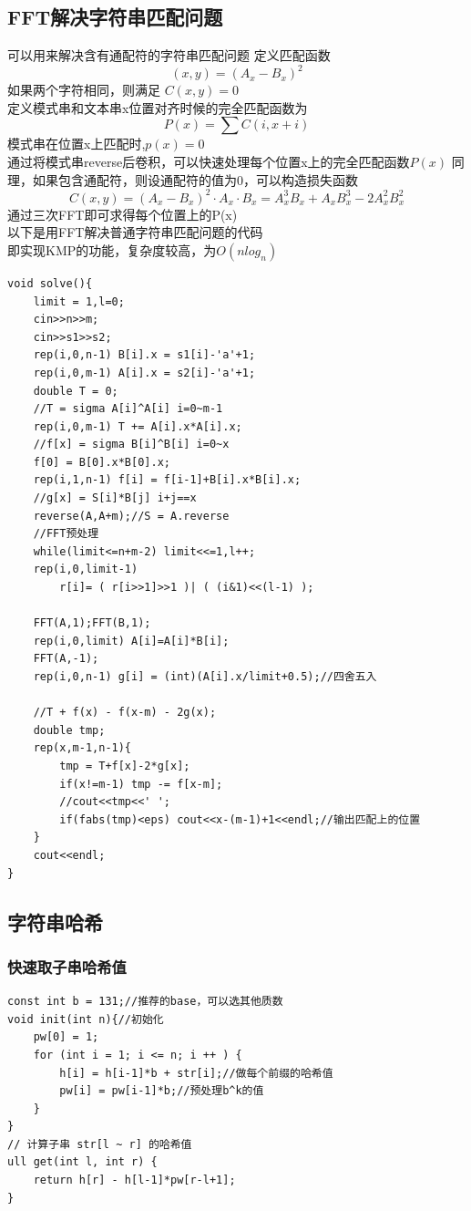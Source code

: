 \documentclass[a4]{ctexart}
\begin{document}
\subsection{FFT解决字符串匹配问题}
可以用来解决含有通配符的字符串匹配问题
定义匹配函数 $$(x,y) = (A_x-B_x)^2$$
如果两个字符相同，则满足 $C(x,y)=0$\\
定义模式串和文本串x位置对齐时候的完全匹配函数为
$$P(x)=\sum C(i,x+i)$$
模式串在位置x上匹配时,$p(x)=0$\\
通过将模式串reverse后卷积，可以快速处理每个位置x上的完全匹配函数$P(x)$
同理，如果包含通配符，则设通配符的值为0，可以构造损失函数
$$C(x,y)=(A_x-B_x)^2 \cdot A_x \cdot B_x=A_x^3 B_x+A_xB_x^3-2A_x^2B_x^2$$
通过三次FFT即可求得每个位置上的P(x)\\
以下是用FFT解决普通字符串匹配问题的代码\\
即实现KMP的功能，复杂度较高，为$O(nlog_n)$\\
\begin{lstlisting}
void solve(){
    limit = 1,l=0;
    cin>>n>>m;
    cin>>s1>>s2;
    rep(i,0,n-1) B[i].x = s1[i]-'a'+1;
    rep(i,0,m-1) A[i].x = s2[i]-'a'+1;
    double T = 0;
    //T = sigma A[i]^A[i] i=0~m-1
    rep(i,0,m-1) T += A[i].x*A[i].x;
    //f[x] = sigma B[i]^B[i] i=0~x
    f[0] = B[0].x*B[0].x;
    rep(i,1,n-1) f[i] = f[i-1]+B[i].x*B[i].x;
    //g[x] = S[i]*B[j] i+j==x
    reverse(A,A+m);//S = A.reverse
    //FFT预处理
    while(limit<=n+m-2) limit<<=1,l++;
    rep(i,0,limit-1)
        r[i]= ( r[i>>1]>>1 )| ( (i&1)<<(l-1) );
    
    FFT(A,1);FFT(B,1);
    rep(i,0,limit) A[i]=A[i]*B[i];
    FFT(A,-1);
    rep(i,0,n-1) g[i] = (int)(A[i].x/limit+0.5);//四舍五入
    
    //T + f(x) - f(x-m) - 2g(x);
    double tmp;
    rep(x,m-1,n-1){
        tmp = T+f[x]-2*g[x];
        if(x!=m-1) tmp -= f[x-m];
        //cout<<tmp<<' ';
        if(fabs(tmp)<eps) cout<<x-(m-1)+1<<endl;//输出匹配上的位置
    }
    cout<<endl;
}
\end{lstlisting}

\subsection{字符串哈希}

\subsubsection{快速取子串哈希值}
\begin{lstlisting}
const int b = 131;//推荐的base，可以选其他质数
void init(int n){//初始化 
    pw[0] = 1;
    for (int i = 1; i <= n; i ++ ) {
        h[i] = h[i-1]*b + str[i];//做每个前缀的哈希值 
        pw[i] = pw[i-1]*b;//预处理b^k的值 
    }
}
// 计算子串 str[l ~ r] 的哈希值
ull get(int l, int r) {
    return h[r] - h[l-1]*pw[r-l+1];
}
\end{lstlisting}
\end{document}
